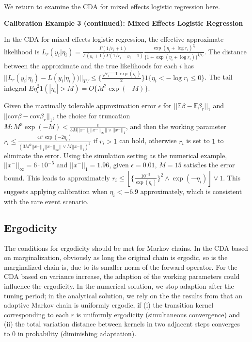 \documentclass[10pt]{article}
\begin{document}
We return to examine the CDA for mixed effects logistic regression here.

{\bf Calibration Example 3 (continued): Mixed Effects Logistic Regression}

In the CDA for mixed effects logistic regression, the effective approximate likelihood is $L_{r}(y_i|\eta_i) = \frac{\Gamma(1/r_i+1)}{\Gamma(y_i+1)\Gamma(1/r_i-y_i+1)}\frac{\exp (\eta_i+ \log r_i)^ {y_i}}{\{1+\exp (\eta_i+ \log r_i)\}^{1/r_i}}$. The distance between the approximate and the true likelihoods for each $i$ has $|| { L_{r}(y_i|\eta_i) } - {L(y_i|\eta_i)} )||_{TV} \le   \{   \frac{\sqrt{r_i-1}  \exp(\eta_i)}{2} \} 1 \{\eta_i< - \log r_i \le 0 \}$. The tail integral $E \eta^2_i 1(|\eta_i|>M) = O\{ M^2 \exp(-M)\}$. 

Given the maximally tolerable approximation error $\epsilon$ for $||\mathbb{E}\beta-\mathbb{E}\beta_r||_1$ and $||\mbox{cov}\beta-\mbox{cov}\beta_r||_1$, the choice for truncation $M: M^3 \exp(-M) < \frac{\epsilon}{3M  ||x^{-}||_1 ||x^{-}||_\infty || \vee ||x^{-}||_1 }$, and then the working parameter $r_i \le \frac{ 4 \epsilon^2 \exp(-2\eta_i)}{(3M^2  ||x^{-}||_1 ||x^{-}||_\infty || \vee M ||x^{-}||_1 )^2} $ if $r_i>1$ can hold, otherwise $r_i$ is set to $1$ to eliminate the error. Using the simulation setting as the numerical example, $||x^{-}||_\infty =6 \cdot 10^{-5}$ and $||x^{-}||_1 =1.96$, given $\epsilon=0.01$, $M=15$ satisfies the error bound. This leads to approximately $r_i \le  [\{\frac{10^{-3} }{\exp(\eta_i)}\}^2  \wedge {\exp(-\eta_i)} ]  \vee 1$. This suggests applying calibration when $\eta_i< -6.9$ approximately, which is consistent with the rare event scenario.

\subsection{Ergodicity}

The conditions for ergodicity should be met for Markov chains. In the CDA based on marginalization, obviously as long the original chain is ergodic, so is the marginalized chain is, due to its smaller norm of the forward operator. For the CDA based on variance increase, the adaption of the working parameters could influence the ergodicity. In the numerical solution, we stop adaption after the tuning period; in the analytical solution, we rely on the the results from \cite{roberts2007coupling} that an adaptive Markov chain is uniformly ergodic, if (i) the transition kernel corresponding to each $r$ is uniformly ergodicity (simultaneous convergence) and (ii) the total variation distance between kernels in two adjacent steps converges to $0$ in probability (diminishing adaptation).
\end{document}
